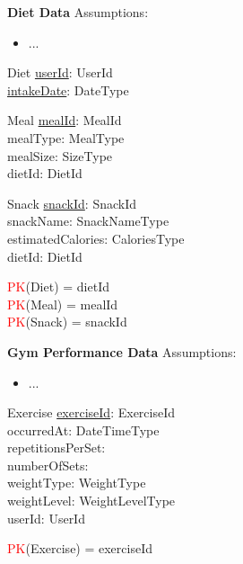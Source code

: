 \documentclass{article}
\begin{document}
\vspace{0.2cm}
\hspace{-0.5cm}\textbf{Diet Data}
\newline \newline Assumptions:
\begin{itemize}
  \item ...
\end{itemize}

\begin{schema}{Diet}
    \underline{userId}: UserId \\
    \underline{intakeDate}: DateType \\
\end{schema}

\begin{schema}{Meal}
	\underline{mealId}: MealId \\
    mealType: MealType \\
    mealSize: SizeType \\
    dietId: DietId \\
\end{schema}

\begin{schema}{Snack}
	\underline{snackId}: SnackId \\
    snackName: SnackNameType \\
    estimatedCalories: CaloriesType \\
    dietId: DietId \\
\end{schema}

\begin{zed}
\textcolor{red}{PK}(Diet) = { dietId } \\
\textcolor{red}{PK}(Meal) = { mealId } \\
\textcolor{red}{PK}(Snack) = { snackId } \\
\end{zed}
    
\vspace{0.2cm}
\hspace{-0.5cm}\textbf{Gym Performance Data}
\newline \newline Assumptions:
\begin{itemize}
  \item ...
\end{itemize}

\begin{schema}{Exercise}
	\underline{exerciseId}: ExerciseId \\
    occurredAt: DateTimeType \\
    repetitionsPerSet: \nat \\
    numberOfSets: \nat \\
    weightType: WeightType \\
    weightLevel: WeightLevelType \\
    userId: UserId \\
\end{schema}
\begin{zed}
\textcolor{red}{PK}(Exercise) = { exerciseId } \\
\end{zed}
\end{document}
